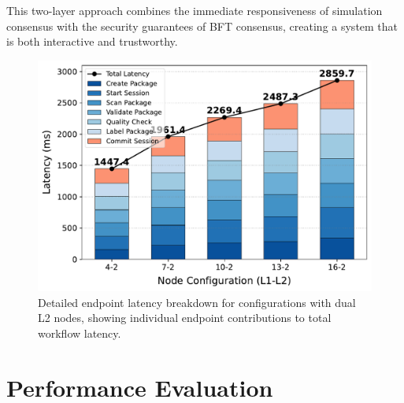\documentclass[conference]{IEEEtran}
\begin{document}
This two-layer approach combines the immediate responsiveness of simulation consensus with the security guarantees of BFT consensus, creating a system that is both interactive and trustworthy.

\begin{figure}[t]
    \centering
    \includegraphics[width=1\linewidth]{figure/ieee_stacked_latency_l1_l2_2.pdf}
    \caption{Detailed endpoint latency breakdown for configurations with dual L2 nodes, showing individual endpoint contributions to total workflow latency.}
    \label{fig:stacked-endpoints-l2-2}
\end{figure}

\section{Performance Evaluation}
\label{sec:implementation}
\end{document}
